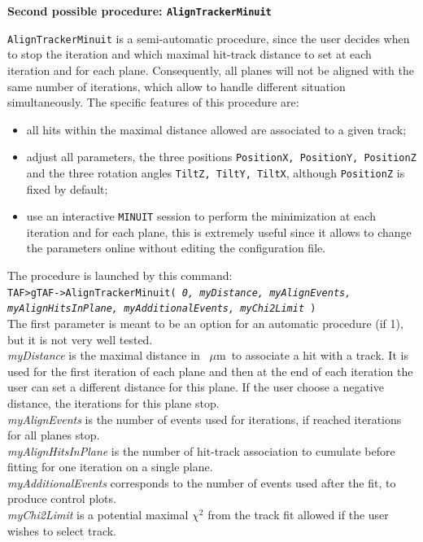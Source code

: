 \documentclass[a4paper, 12pt, twoside]{article}
\def\mm{~$\mu$m}
\begin{document}
\vspace{0.8 cm}

\noindent
{\bf Second possible procedure: {\tt AlignTrackerMinuit}}

\noindent
{\tt AlignTrackerMinuit} is a semi-automatic procedure, since the user decides when to stop the iteration and which maximal hit-track distance to set at each iteration and for each plane. Consequently, all planes will not be aligned with the same number of iterations, which allow to handle different situation simultaneously.
The specific features of this procedure are:
\begin{itemize}
\item all hits within the maximal distance allowed are associated to a given track;
\item adjust all parameters, the three positions {\tt PositionX, PositionY, PositionZ} and the three rotation angles {\tt TiltZ, TiltY, TiltX}, although {\tt PositionZ} is fixed by default;
\item use an interactive {\tt MINUIT} session to perform the minimization at each iteration and for each plane, this is extremely useful since it allows to change the parameters online without editing the configuration file.
\end{itemize}

\noindent
The procedure is launched by this command:\\
{\tt TAF>gTAF->AlignTrackerMinuit( {\it 0, myDistance, myAlignEvents, myAlignHitsInPlane, myAdditionalEvents, myChi2Limit} )}\\

\noindent
The first parameter is meant to be an option for an automatic procedure (if 1), but  it is not very well tested.\\
{\it myDistance} is the maximal distance in \mm\ to associate a hit with a track. It is used for the first iteration of each plane and then at the end of each iteration the user can set a different distance for this plane. If the user choose a negative distance, the iterations for this plane stop.\\
{\it myAlignEvents} is the number of events used for iterations, if reached iterations for all planes stop.\\
{\it myAlignHitsInPlane} is the number of hit-track association to cumulate before fitting for one iteration on a single plane.\\
{\it myAdditionalEvents} corresponds to the number of events used after the fit, to produce control plots.\\
{\it myChi2Limit} is a potential maximal $\chi^{2}$ from the track fit allowed if the user wishes to select track.\\
\end{document}
